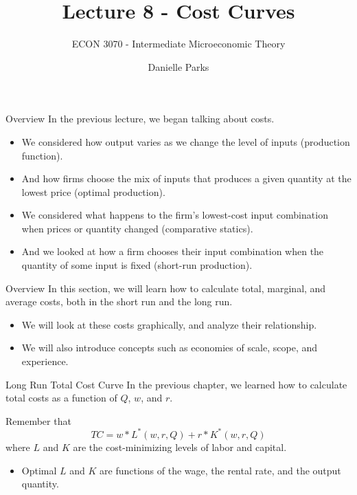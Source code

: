 \documentclass{beamer}
\author{Danielle Parks}
\title{Lecture 8 - Cost Curves}
\subtitle{ECON 3070 - Intermediate Microeconomic Theory}
\begin{document}
\begin{frame}
  \titlepage
\end{frame}

\begin{frame}{Overview}
  In the previous lecture, we began talking about costs.

  \begin{itemize}
    \item We considered how output varies as we change the level of inputs (production function).
    
    \item And how firms choose the mix of inputs that produces a given quantity at the lowest price (optimal production).
    
    \item We considered what happens to the firm's lowest-cost input combination when prices or quantity changed (comparative statics).
    
    \item And we looked at how a firm chooses their input combination when the quantity of some input is fixed (short-run production).
  \end{itemize}
\end{frame}

\begin{frame}{Overview}
  In this section, we will learn how to calculate total, marginal, and average costs, both in the short run and the long run.

  \begin{itemize}
    \item We will look at these costs graphically, and analyze their relationship.
    \item We will also introduce concepts such as economies of scale, scope, and experience.
  \end{itemize}

\end{frame}

\begin{frame}{Long Run Total Cost Curve}
  In the previous chapter, we learned how to calculate total costs as a function of $Q$, $w$, and $r$.
  
  \bigskip
  Remember that 
  $$
  TC = w*L^*(w,r,Q)+r*K^*(w,r,Q)
  $$
  where $L$ and $K$ are the cost-minimizing levels of labor and capital.

  \begin{itemize}
    \item Optimal $L$ and $K$ are functions of the wage, the rental rate, and the output quantity.
  \end{itemize}
  
\end{frame}
\end{document}
